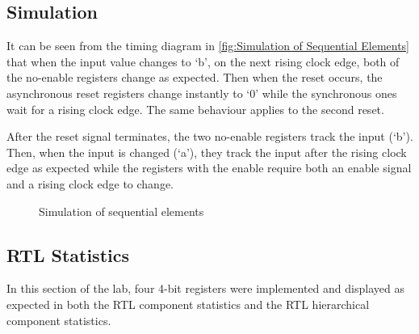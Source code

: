\documentclass[10pt]{article}
\begin{document}
\subsection{Simulation}

It can be seen from the timing diagram in \autoref{fig:Simulation of Sequential Elements} that when the input value changes to `b', on the next rising clock edge, both of the no-enable registers change as expected. Then when the reset occurs, the asynchronous reset registers change instantly to `0' while the synchronous ones wait for a rising clock edge. The same behaviour applies to the second reset.


After the reset signal terminates, the two no-enable registers track the input (`b'). Then, when the input is changed (`a'), they track the input after the rising clock edge as expected while the registers with the enable require both an enable signal and a rising clock edge to change. 

\begin{figure}[ht]
    \centering
    \caption{Simulation of sequential elements}
    \label{fig:Simulation of Sequential Elements}
\end{figure}
\newpage



\subsection{RTL Statistics}

In this section of the lab, four 4-bit registers were implemented and displayed as expected in both the RTL component statistics and the RTL hierarchical component statistics. 
\end{document}
